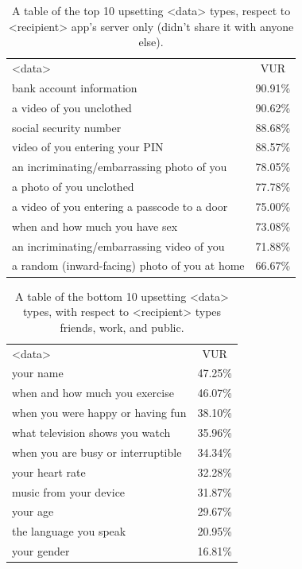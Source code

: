 \documentclass{acm_proc_article-sp}
\begin{document}
\begin{table}%
\begin{center}
\begin{tabular}{| l | c |}
<data> &  VUR  \\
bank account information & 90.91\% \\
a video of you unclothed & 90.62\% \\
social security number  & 88.68\% \\
video of you entering your PIN & 88.57\% \\
an incriminating/embarrassing photo of you & 78.05\% \\
a photo of you unclothed & 77.78\% \\
a video of you entering a passcode to a door & 75.00\% \\
when and how much you have sex & 73.08\% \\
an incriminating/embarrassing video of you & 71.88\% \\
a random (inward-facing) photo of you at home & 66.67\% \\
\end{tabular}
\caption{A table of the top 10 upsetting <data> types, respect to <recipient> app's server only (didn't share it with anyone else).}
\label{notsharedtop10}
\end{center}
\end{table}

\begin{table}%
\begin{center}
\begin{tabular}{| l | c |}
<data> &  VUR  \\
your name & 47.25\% \\
when and how much you exercise & 46.07\% \\
when you were happy or having fun & 38.10\% \\
what television shows you watch & 35.96\% \\
when you are busy or interruptible & 34.34\% \\
your heart rate & 32.28\% \\
music from your device & 31.87\% \\
your age & 29.67\% \\
the language you speak & 20.95\% \\
your gender & 16.81\% \\
\end{tabular}
\caption{A table of the bottom 10 upsetting <data> types, with respect to <recipient> types friends, work, and public.}
\label{sharedbottom10}
\end{center}
\end{table}
\end{document}
